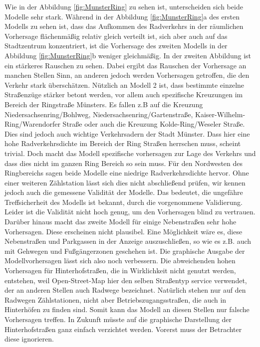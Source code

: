 \documentclass[a4paper,12pt]{thesis}
\begin{document}
Wie in der Abbildung \ref{fig:MunsterRing} zu sehen ist, unterscheiden sich beide Modelle sehr stark. Während in der Abbildung \ref{fig:MunsterRing}a des ersten Modells zu sehen ist, dass das Aufkommen des Radverkehrs in der räumlichen Vorhersage flächenmäßig relativ gleich verteilt ist, sich aber auch auf das Stadtzentrum konzentriert, ist die Vorhersage des zweiten Modells in der Abbildung \ref{fig:MunsterRing}b weniger gleichmäßig. In der zweiten Abbildung ist ein stärkeres Rauschen zu sehen. Dabei ergibt das Rauschen der Vorhersage an manchen Stellen Sinn, an anderen jedoch werden Vorhersagen getroffen, die den Verkehr stark überschätzen. Nützlich an Modell 2 ist, dass bestimmte einzelne Straßenzüge stärker betont werden, vor allem auch spezifische Kreuzungen im Bereich der Ringstraße Münsters. Es fallen z.B auf die Kreuzung Niedersachsenring/Bohlweg, Niedersachsenring/Gartenstraße, Kaiser-Wilhelm-Ring/Warendorfer Straße oder auch die Kreuzung Kolde-Ring/Weseler Straße. Dies sind jedoch auch wichtige Verkehrsadern der Stadt Münster. Dass hier eine hohe Radverkehrsdichte im Bereich der Ring Straßen herrschen muss, scheint trivial. Doch macht das Modell spezifische vorhersagen zur Lage des Verkehrs und dass dies nicht im ganzen Ring Bereich so sein muss. Für den Nordwesten des Ringbereichs sagen beide Modelle eine niedrige Radverkehrsdichte hervor. Ohne einer weiteren Zählstation lässt sich dies nicht abschließend prüfen, wir kennen jedoch auch die gemessene Validität der Modelle. Das bedeutet, die ungefähre Treffsicherheit des Modells ist bekannt, durch die vorgenommene Validierung. Leider ist die Validität nicht hoch genug, um den Vorhersagen blind zu vertrauen. Darüber hinaus macht das zweite Modell für einige Nebenstraßen sehr hohe Vorhersagen. Diese erscheinen nicht plausibel. Eine Möglichkeit wäre es, diese Nebenstraßen und Parkgassen in der Anzeige auszuschließen, so wie es z.B. auch mit Gehwegen und Fußgängerzonen geschehen ist. Die graphische Ausgabe der Modellvorhersagen lässt sich also noch verbessern. Die abweichenden hohen Vorhersagen für Hinterhofstraßen, die in Wirklichkeit nicht genutzt werden, entstehen, weil Open-Street-Map hier den selben Straßentyp \glqq{}service\grqq{} verwendet, der an anderen Stellen auch Radwege bezeichnet. Natürlich stehen nur auf den Radwegen Zählstationen, nicht aber Betriebszugangsstraßen, die auch in Hinterhöfen zu finden sind. Somit kann das Modell an diesen Stellen nur falsche Vorhersagen treffen. In Zukunft müsste auf die graphische Darstellung der Hinterhofstraßen ganz einfach verzichtet werden. Vorerst muss der Betrachter diese ignorieren.\\
\end{document}
